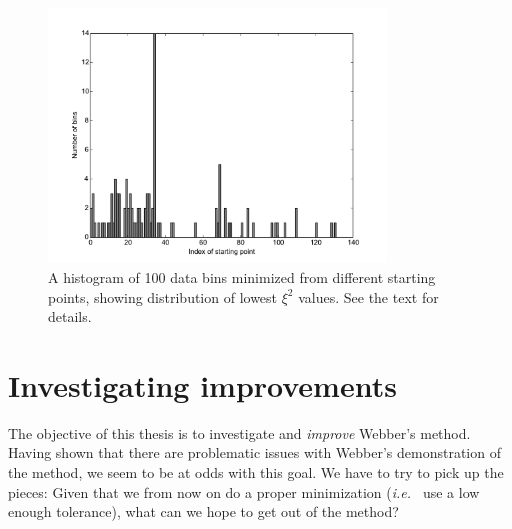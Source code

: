 \documentclass[twoside,english]{uiofysmaster}
\begin{document}
\begin{figure}[hbt]
	\centering
	\includegraphics[width=0.8\textwidth]{figures/webber_rec_table/histogram_of_starting_points_with_lowest_minimal_value.pdf}
	\caption{A histogram of 100 data bins minimized from different starting points, showing distribution of lowest $\xi^2$ values. See the text for details.}
	\label{fig:webber_rec_hist_starting_points}
\end{figure}







\clearpage






\section{Investigating improvements}
The objective of this thesis is to investigate and {\it improve} Webber's method. Having shown that there are problematic issues with Webber's demonstration of the method, we seem to be at odds with this goal. We have to try to pick up the pieces: Given that we from now on do a proper minimization ({\it i.e.\ } use a low enough tolerance), what can we hope to get out of the method? 

\end{document}
